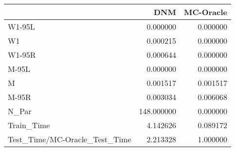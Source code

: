 \begin{tabular}{lrr}
\toprule
{} &         DNM &  MC-Oracle \\
\midrule
W1-95L                        &    0.000000 &   0.000000 \\
W1                            &    0.000215 &   0.000000 \\
W1-95R                        &    0.000644 &   0.000000 \\
M-95L                         &    0.000000 &   0.000000 \\
M                             &    0.001517 &   0.001517 \\
M-95R                         &    0.003034 &   0.006068 \\
N\_Par                         &  148.000000 &   0.000000 \\
Train\_Time                    &    4.142626 &   0.089172 \\
Test\_Time/MC-Oracle\_Test\_Time &    2.213328 &   1.000000 \\
\bottomrule
\end{tabular}
